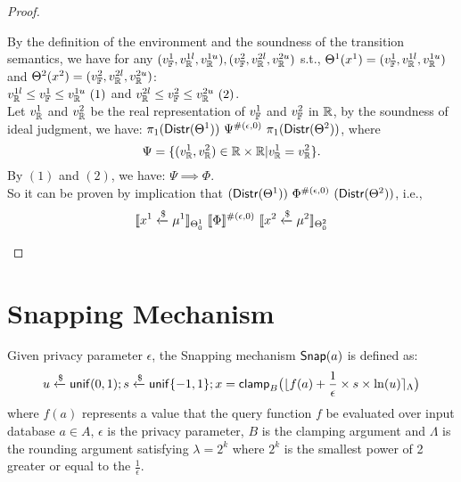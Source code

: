\documentclass[a4paper,11pt]{article}
\begin{document}
\begin{proof}
\begin{itemize}
	By the definition of the environment and the soundness of the transition semantics, we have for any $(v_{\mathbb{F}}^1, v_{\mathbb{R}}^{1l}, v_{\mathbb{R}}^{1u}), (v_{\mathbb{F}}^2, v_{\mathbb{R}}^{2l}, v_{\mathbb{R}}^{2u})$ s.t.,
	$\Theta^1 (x^1) = (v_{\mathbb{F}}^1, v_{\mathbb{R}}^{1l}, v_{\mathbb{R}}^{1u})$
	and
	$\Theta^2 (x^2) = (v_{\mathbb{F}}^2, v_{\mathbb{R}}^{2l}, v_{\mathbb{R}}^{2u})$:
	\\
	$ v_{\mathbb{R}}^{1l} \leq v_{\mathbb{F}}^1 \leq v_{\mathbb{R}}^{1u} ~ (1)$ 
	and
	$ v_{\mathbb{R}}^{2l} \leq v_{\mathbb{F}}^2 \leq v_{\mathbb{R}}^{2u} ~ (2)$.
	\\
	Let $v_{\mathbb{R}}^1$ and $v_{\mathbb{R}}^2$ be the real representation of $v_{\mathbb{F}}^1$ and $v_{\mathbb{F}}^2$ in $\mathbb{R}$, by the soundness of ideal judgment, we have:
	$\pi_1 (\mathsf{Distr}(\Theta^1)) ~ \Psi^{\#(\epsilon, 0)} ~ \pi_1 (\mathsf{Distr}(\Theta^2))$, where
	\[
		\Psi = \{(v_{\mathbb{R}}^1, v_{\mathbb{R}}^2) \in \mathbb{R} \times \mathbb{R}
		| 
		v_{\mathbb{R}}^1 = v_{\mathbb{R}}^2 \}.
	\]
	By $(1)$ and $(2)$, we have:
	$\Psi \implies \Phi$.
	\\
	So it can be proven by implication that 
	$(\mathsf{Distr}(\Theta^1)) ~ \Phi^{\#(\epsilon, 0)} ~ (\mathsf{Distr}(\Theta^2))$, i.e., 
	$$
	\llbracket x^1 \xleftarrow{\$} \mu^1 \rrbracket_{\Theta^1_0} 
		~ \llbracket \Phi \rrbracket^{\#(\epsilon, 0)} ~
		\llbracket x^2 \xleftarrow{\$} \mu^2 \rrbracket_{\Theta^2_0}
	$$
	\end{itemize}
\end{proof}


\newpage
\section{Snapping Mechanism}

\begin{defn}
Given privacy parameter $\epsilon$, the Snapping mechanism $\mathsf{Snap}(a)$ is defined as:
\[
	u \xleftarrow{\$} \mathsf{unif}(0,1); s \xleftarrow{\$} \mathsf{unif}\{-1, 1\};
	x = \mathsf{clamp}_B \big(
	\lfloor f(a) + \frac{1}{\epsilon} \times s \times \ln (u) \rceil_{\Lambda}
	\big)
\]
where $f(a)$ represents a value that the query function $f$ be evaluated over input database $a \in A$, $\epsilon$ is the privacy parameter, $B$ is the clamping argument and $\Lambda$ is the rounding argument satisfying $\lambda = 2^k$ where $2^k$ is the smallest power of 2 greater or equal to the $\frac{1}{\epsilon}$.
\end{defn}
\end{document}
